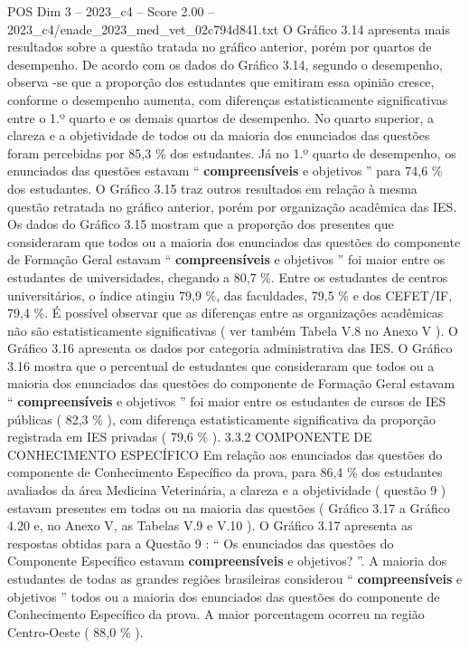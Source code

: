 \begin{textsample}{POS Dim 3 – 2023\_c4 – Score 2.00 – 2023\_c4/enade\_2023\_med\_vet\_02c794d841.txt}
O Gráfico 3.14 apresenta mais resultados sobre a questão tratada no gráfico anterior, porém por quartos de desempenho.
De acordo com os dados do Gráfico 3.14, segundo o desempenho, observa -se que a proporção dos estudantes que emitiram essa opinião cresce, conforme o desempenho aumenta, com diferenças estatisticamente significativas entre o 1.º quarto e os demais quartos de desempenho.
No quarto superior, a clareza e a objetividade de todos ou da maioria dos enunciados das questões foram percebidas por 85,3 \% dos estudantes.
Já no 1.º quarto de desempenho, os enunciados das questões estavam “ \textbf{compreensíveis} e objetivos ” para 74,6 \% dos estudantes.
O Gráfico 3.15 traz outros resultados em relação à mesma questão retratada no gráfico anterior, porém por organização acadêmica das IES.
Os dados do Gráfico 3.15 mostram que a proporção dos presentes que consideraram que todos ou a maioria dos enunciados das questões do componente de Formação Geral estavam “ \textbf{compreensíveis} e objetivos ” foi maior entre os estudantes de universidades, chegando a 80,7 \%.
Entre os estudantes de centros universitários, o índice atingiu 79,9 \%, das faculdades, 79,5 \% e dos CEFET/IF, 79,4 \%.
É possível observar que as diferenças entre as organizações acadêmicas não são estatisticamente significativas ( ver também Tabela V.8 no Anexo V ).
O Gráfico 3.16 apresenta os dados por categoria administrativa das IES.
O Gráfico 3.16 mostra que o percentual de estudantes que consideraram que todos ou a maioria dos enunciados das questões do componente de Formação Geral estavam “ \textbf{compreensíveis} e objetivos ” foi maior entre os estudantes de cursos de IES públicas ( 82,3 \% ), com diferença estatisticamente significativa da proporção registrada em IES privadas ( 79,6 \% ). 3.3.2 COMPONENTE DE CONHECIMENTO ESPECÍFICO Em relação aos enunciados das questões do componente de Conhecimento Específico da prova, para 86,4 \% dos estudantes avaliados da área Medicina Veterinária, a clareza e a objetividade ( questão 9 ) estavam presentes em todas ou na maioria das questões ( Gráfico 3.17 a Gráfico 4.20 e, no Anexo V, as Tabelas V.9 e V.10 ).
O Gráfico 3.17 apresenta as respostas obtidas para a Questão 9 : “ Os enunciados das questões do Componente Específico estavam \textbf{compreensíveis} e objetivos? ”.
A maioria dos estudantes de todas as grandes regiões brasileiras considerou “ \textbf{compreensíveis} e objetivos ” todos ou a maioria dos enunciados das questões do componente de Conhecimento Específico da prova.
A maior porcentagem ocorreu na região Centro-Oeste ( 88,0 \% ).

\end{textsample}
